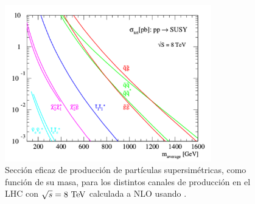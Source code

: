 \begin{figure}[!htbp]
  \centering
  \includegraphics[width=0.8\textwidth]{figures/susy_lhc_xs_8tev}
  \caption{Sección eficaz de producción de partículas supersimétricas, como
    función de su masa, para los distintos canales de producción en el LHC con
    $\sqrt{s} = 8 \tev$ calculada a NLO usando {\prospino} \cite{Beenakker:1996ed}.}
  \label{fig:xs_lhc_8tev}
\end{figure}








